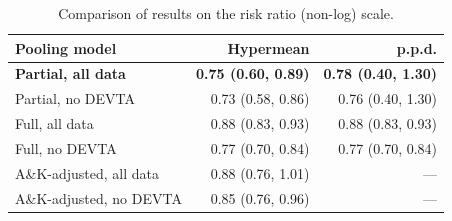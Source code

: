 \documentclass[12pt]{article}
\begin{document}
\begin{table}
\caption{Comparison of results of all four meta-analysis models fitted to our data, on log(RR) scale.}
\label{baggr-models-tab}
\centering
{}
\end{table}

\begin{table}
\caption{Comparison of results on the risk ratio (non-log) scale.}
\label{baggr-tab-exp}
\begin{tabular}[t]{lrr}
\toprule
Pooling model & Hypermean & p.p.d.\\
\midrule
\textbf{Partial, all data} & \textbf{0.75 (0.60, 0.89)} & \textbf{0.78 (0.40, 1.30)}\\
Partial, no DEVTA & 0.73 (0.58, 0.86) & 0.76 (0.40, 1.30)\\
Full, all data & 0.88 (0.83, 0.93) & 0.88 (0.83, 0.93)\\
Full, no DEVTA & 0.77 (0.70, 0.84) & 0.77 (0.70, 0.84)\\
A\&K-adjusted, all data & 0.88 (0.76, 1.01) & ---\\
A\&K-adjusted, no DEVTA & 0.85 (0.76, 0.96) & ---\\
\bottomrule
\end{tabular}
\end{table}
\end{document}
